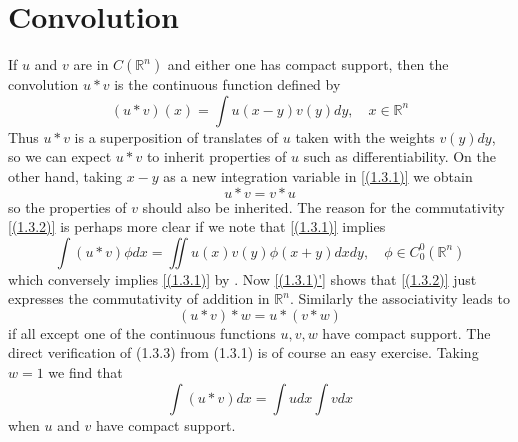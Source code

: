 \section{Convolution}
If $u$ and $v$ are in $C(\mathbb{R}^{n})$ and either one has compact support, then the convolution $u * v$ is the continuous function defined by
\begin{equation}
    \label{(1.3.1)}
	(u * v)(x)=\int u(x-y) v(y) d y, \quad x \in \mathbb{R}^{n} 
\end{equation}
Thus $u * v$ is a superposition of translates of $u$ taken with the weights $v(y) d y$, so we can expect $u * v$ to inherit properties of $u$ such as differentiability. On the other hand, taking $x-y$ as a new integration variable in \eqref{(1.3.1)} we obtain
\begin{equation}
    \label{(1.3.2)}
	u * v=v * u 
\end{equation}
so the properties of $v$ should also be inherited. The reason for the commutativity \eqref{(1.3.2)} is perhaps more clear if we note that \eqref{(1.3.1)} implies
\begin{equation}
    \label{(1.3.1)'}
    \int(u * v) \phi d x=\iint u(x) v(y) \phi(x+y) d x d y, \quad \phi \in C_{0}^{0}\left(\mathbb{R}^{n}\right)
\end{equation}
which conversely implies \eqref{(1.3.1)} by . Now \eqref{(1.3.1)'} shows that \eqref{(1.3.2)} just expresses the commutativity of addition in $\mathbb{R}^{n}$. Similarly the associativity leads to
\begin{equation}
    \label{(1.3.3)}
    (u * v) * w=u *(v * w)
\end{equation}
if all except one of the continuous functions $u, v, w$ have compact support. The direct verification of (1.3.3) from (1.3.1) is of course an easy exercise. Taking $w=1$ we find that
\begin{equation}
    \label{(1.3.4)}
	\int(u * v) d x=\int u d x \int v d x
\end{equation}
when $u$ and $v$ have compact support.

